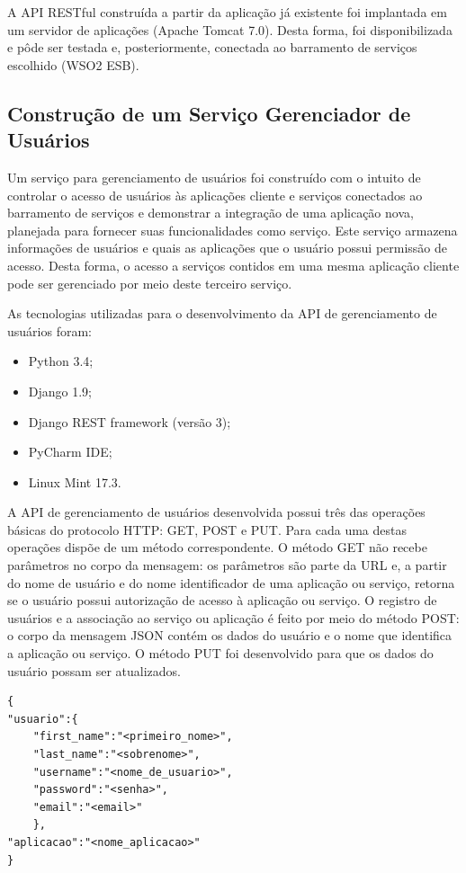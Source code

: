 A API RESTful construída a partir da aplicação já existente foi implantada em um servidor de aplicações (Apache Tomcat 7.0). Desta forma, foi disponibilizada e pôde ser testada e, posteriormente, conectada ao barramento de serviços escolhido (WSO2 ESB).

\subsection{Construção de um Serviço Gerenciador de Usuários}
Um serviço para gerenciamento de usuários foi construído com o intuito de controlar o acesso de usuários às aplicações cliente e serviços conectados ao barramento de serviços e demonstrar a integração de uma aplicação nova, planejada para fornecer suas funcionalidades como serviço. Este serviço armazena informações de usuários e quais as aplicações que o usuário possui permissão de acesso. Desta forma, o acesso a serviços contidos em uma mesma aplicação cliente pode ser gerenciado por meio deste terceiro serviço.

As tecnologias utilizadas para o desenvolvimento da API de gerenciamento de usuários foram:
\begin{itemize}
\item Python 3.4;
\item Django 1.9;
\item Django REST framework (versão 3);
\item PyCharm IDE;
\item Linux Mint 17.3.
\end{itemize}

A API de gerenciamento de usuários desenvolvida possui três das operações básicas do protocolo HTTP: GET, POST e PUT. Para cada uma destas operações dispõe de um método correspondente. O método GET não recebe parâmetros no corpo da mensagem: os parâmetros são parte da URL e, a partir do nome de usuário e do nome identificador de uma aplicação ou serviço, retorna se o usuário possui autorização de acesso à aplicação ou serviço. O registro de usuários e a associação ao serviço ou aplicação é feito por meio do método POST: o corpo da mensagem JSON contém os dados do usuário e o nome que identifica a aplicação ou serviço. O método PUT foi desenvolvido para que os dados do usuário possam ser atualizados.


\begin{lstlisting}[caption={Formato de mensagem recebido pelo serviço de gerenciamento de usuários (método POST).},label={lst:msgloginpost}]
{
"usuario":{
	"first_name":"<primeiro_nome>",
	"last_name":"<sobrenome>",
	"username":"<nome_de_usuario>",
	"password":"<senha>",
	"email":"<email>"
	},
"aplicacao":"<nome_aplicacao>"
}
\end{lstlisting}

